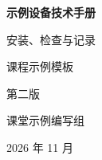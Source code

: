\begin{titlepage}
  \thispagestyle{empty}
  \centering
  \vspace*{3.2cm}
  {\sffamily\Huge\bfseries 示例设备技术手册\par}
  \vspace{0.8cm}
  {\Large 安装、检查与记录\par}
  \vspace{2.2cm}
  {\large 课程示例模板\par}
  \vspace{0.4cm}
  {\large 第二版\par}
  \vfill
  {\large 课堂示例编写组\par}
  \vspace{0.4cm}
  {\large 2026 年 11 月\par}
\end{titlepage}
